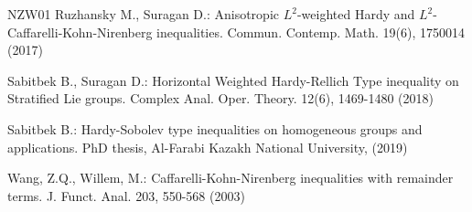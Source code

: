 \documentclass[a4paper,12pt,reqno]{amsart}
\theoremstyle{theorem}
\numberwithin{equation}{section}
\theoremstyle{plain}
\theoremstyle{definition}
\theoremstyle{defi}
\begin{document}
\begin{thebibliography}{NZW01}
Ruzhansky M., Suragan D.: Anisotropic $L^2$-weighted Hardy and $L^2$-Caffarelli-Kohn-Nirenberg inequalities.  Commun. Contemp. Math. 19(6), 1750014 (2017)

Sabitbek B., Suragan D.: Horizontal Weighted Hardy-Rellich Type inequality on Stratified Lie groups. Complex Anal. Oper. Theory. 12(6), 1469-1480 (2018)

Sabitbek B.: Hardy-Sobolev type inequalities on homogeneous groups and applications. PhD thesis, Al-Farabi Kazakh National University, (2019)

Wang, Z.Q., Willem, M.: Caffarelli-Kohn-Nirenberg inequalities with remainder terms. J. Funct. Anal. 203, 550-568 (2003)


\end{thebibliography}
\end{document}

